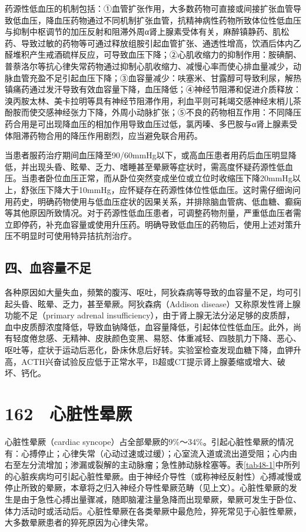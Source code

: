 药源性低血压的机制包括：①血管扩张作用，大多数药物可直接或间接扩张血管导致低血压，降血压药物通过不同机制扩张血管，抗精神病性药物所致体位性低血压与抑制中枢调节的加压反射和阻滞外周α肾上腺素受体有关，麻醉镇静药、肌松药、导致过敏的药物等可通过释放组胺引起血管扩张、通透性增高，饮酒后体内乙醛堆积产生戒酒硫样反应，可导致血压下降；②心肌收缩力的抑制作用：胺碘酮、普萘洛尔等抗心律失常药物通过抑制心肌收缩力、减慢心率而使心排血量减少，动脉血管充盈不足引起血压下降；③血容量减少：呋塞米、甘露醇可导致利尿，解热镇痛药通过发汗导致有效血容量下降，血压降低；④神经节阻滞和促进介质释放：溴丙胺太林、美卡拉明等具有神经节阻滞作用，利血平则可耗竭交感神经末梢儿茶酚胺而使交感神经张力下降，外周小动脉扩张；⑤不良的药物相互作用：不同降压药合用是可出现降血压的相加作用导致血压过低，氯丙嗪、多巴胺与α肾上腺素受体阻滞药物合用的降压作用剧烈，应当避免联合用药。

当患者服药治疗期间血压降至90/60mmHg以下，或高血压患者用药后血压明显降低，并出现头昏、眩晕、乏力、嗜睡甚至晕厥等症状时，需高度怀疑药源性低血压。当患者卧位血压正常，而从卧位突然变成坐位或立位时收缩压下降20mmHg以上，舒张压下降大于10mmHg，应怀疑存在药源性体位性低血压。这时需仔细询问用药史，明确药物使用与低血压症状的因果关系，并排除脑血管病、低血糖、癫痫等其他原因所致情况。对于药源性低血压患者，可调整药物剂量，严重低血压者需立即停药，补充血容量或使用升压药。明确导致低血压的药物后，使用上述对策升压不明显时可使用特异拮抗剂治疗。

\subsection{四、血容量不足}

各种原因如大量失血，频繁的腹泻、呕吐，阿狄森病等导致的血容量不足，均可引起头昏、眩晕、乏力，甚至晕厥。阿狄森病（Addison
disease）又称原发性肾上腺功能不足（primary adrenal
insufficiency），由于肾上腺无法分泌足够的皮质醇，血中皮质醇浓度降低，导致血钠降低，血容量降低，引起体位性低血压。此外，尚有轻度倦怠感、无精神、皮肤颜色变黑、易怒、体重减轻、四肢肌力下降、恶心、呕吐等，症状于运动后恶化，卧床休息后好转。实验室检查发现血糖下降，血钾升高，ACTH兴奋试验反应低于正常水平，B超或CT提示肾上腺萎缩或增大、破坏、钙化。

\protect\hypertarget{text00367.html}{}{}

\section{162　心脏性晕厥}

心脏性晕厥（cardiac
syncope）占全部晕厥的9\%～34\%。引起心脏性晕厥的情况有：心搏停止；心律失常（心动过速或过缓）；心室流入道或流出道受阻；心内由右至左分流增加；渗漏或裂解的主动脉瘤；急性肺动脉栓塞等。表\ref{tab48-1}中所列的心脏疾病均可引起心脏性晕厥。由于神经介导性（或称神经反射性）心搏减慢或停止所致的晕厥，本章将之归入神经介导性晕厥范畴（见上文）。心脏性晕厥的发生是由于急性心搏出量骤减，随即脑灌注量急降而出现晕厥，晕厥可发生于卧位、体力活动时或活动后。心脏性晕厥在各类晕厥中最危险，猝死常见于心脏性晕厥，大多数晕厥患者的猝死原因为心律失常。


